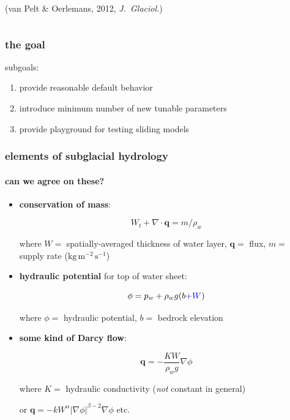 \documentclass[hide notes,intlimits]{beamer}
\begin{document}
\begin{frame}
\begin{columns}
\begin{column}{0.5\textwidth}
\begin{center}
\medskip
\scriptsize (van Pelt \& Oerlemans, 2012, \emph{J.~Glaciol.})
\end{center}
\end{column}
\end{columns}
\end{frame}


\begin{frame}
  \frametitle{the goal}

\begin{center}
\end{center}

\bigskip\bigskip\bigskip
subgoals:

\begin{enumerate}
  \item provide reasonable default behavior
  \item introduce minimum number of new tunable parameters
  \item provide playground for testing sliding models
\end{enumerate}

\end{frame}


\begin{frame}
  \frametitle{elements of subglacial hydrology}
  \framesubtitle{can we agree on these?}

\newcommand{\bq}{\mathbf{q}}
  \begin{itemize}
    \item \textbf{conservation of mass}:
    
    $$W_t + \nabla \cdot \bq = m / \rho_w$$

where $W=$ spatially-averaged thickness of water layer, $\bq=$ flux, $m=$ supply rate ($\text{kg}\,\text{m}^{-2}\,\text{s}^{-1}$)

    \item \textbf{hydraulic potential} {\color{blue} for top of water sheet}:
    
    $$\phi = p_w + \rho_w g (b{\color{blue} + W})$$

where $\phi=$ hydraulic potential, $b=$ bedrock elevation

    \item \textbf{some kind of Darcy flow}:
    
    $$\bq = - \frac{K W}{\rho_w g} \nabla \phi$$
    
    where $K=$ hydraulic conductivity (\emph{not} constant in general)
    
    \medskip\medskip
    \scriptsize or \quad $\bq = - k W^\alpha |\nabla \phi|^{\beta - 2} \nabla \phi$ \quad etc.

  \end{itemize}

\end{frame}
\end{document}
